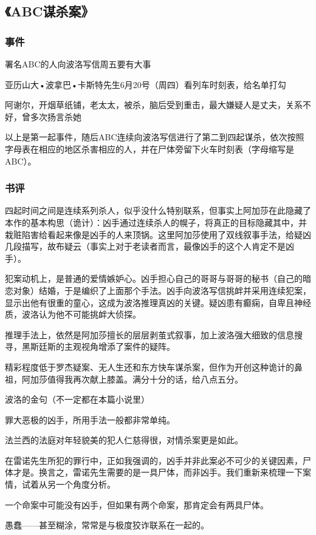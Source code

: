 \subsection{《ABC谋杀案》}

\subsubsection{事件}
署名ABC的人向波洛写信周五要有大事

亚历山大•波拿巴•卡斯特先生6月20号（周四）看列车时刻表，给名单打勾

阿谢尔，开烟草纸铺，老太太，被杀，脑后受到重击，最大嫌疑人是丈夫，关系不好，曾多次扬言杀她

以上是第一起事件，随后ABC连续向波洛写信进行了第二到四起谋杀，依次按照字母表在相应的地区杀害相应的人，并在尸体旁留下火车时刻表（字母缩写是ABC）。

\subsubsection{书评}

四起时间之间是连续系列杀人，似乎没什么特别联系，但事实上阿加莎在此隐藏了本作的基本构思（诡计）：凶手通过连续杀人的幌子，将真正的目标隐藏其中，并栽赃陷害给看起来像是凶手的人来顶锅。这里阿加莎使用了双线叙事手法，给疑凶几段描写，故布疑云（事实上对于老读者而言，最像凶手的这个人肯定不是凶手）。

犯案动机上，是普通的爱情嫉妒心。凶手担心自己的哥哥与哥哥的秘书（自己的暗恋对象）结婚，于是编织了上面那个手法。凶手向波洛写信挑衅并采用连续犯案，显示出他有很重的童心，这成为波洛推理真凶的关键。疑凶患有癫痫，自卑且神经质，波洛认为他不可能挑衅大侦探。

推理手法上，依然是阿加莎擅长的层层剥茧式叙事，加上波洛强大细致的信息搜寻，黑斯廷斯的主观视角增添了案件的疑阵。

精彩程度低于罗杰疑案、无人生还和东方快车谋杀案，但作为开创这种诡计的鼻祖，阿加莎值得我再次献上膝盖。满分十分的话，给八点五分。

波洛的金句（不一定都在本篇小说里）
\begin{itemize*}
    \item 罪大恶极的凶手，所用手法一般都非常单纯。
    \item 法兰西的法庭对年轻貌美的犯人仁慈得很，对情杀案更是如此。
    \item 在雷诺先生所犯的罪行中，正如我强调的，凶手并非此案必不可少的关键因素，尸体才是。换言之，雷诺先生需要的是一具尸体，而非凶手。我们重新来梳理一下案情，试着从另一个角度分析。
    \item 一个命案中可能没有凶手，但如果有两个命案，那肯定会有两具尸体。
    \item 愚蠢——甚至糊涂，常常是与极度狡诈联系在一起的。
\end{itemize*}